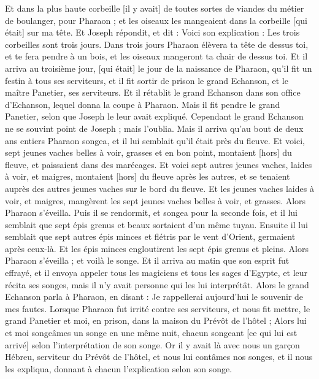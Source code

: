 \begin{multicols}{2}
Et dans la plus haute corbeille [il y avait] de toutes sortes de viandes du métier de boulanger, pour Pharaon ; et les oiseaux les mangeaient dans la corbeille [qui était] sur ma tête.
Et Joseph répondit, et dit : Voici son explication : Les trois corbeilles sont trois jours.
Dans trois jours Pharaon élèvera ta tête de dessus toi, et te fera pendre à un bois, et les oiseaux mangeront ta chair de dessus toi.
Et il arriva au troisième jour, [qui était] le jour de la naissance de Pharaon, qu'il fit un festin à tous ses serviteurs, et il fit sortir de prison le grand Echanson, et le maître Panetier, ses serviteurs.
Et il rétablit le grand Echanson dans son office d'Echanson, lequel donna la coupe à Pharaon.
Mais il fit pendre le grand Panetier, selon que Joseph le leur avait expliqué.
Cependant le grand Echanson ne se souvint point de Joseph ; mais l'oublia.
\VerseOne{}Mais il arriva qu'au bout de deux ans entiers Pharaon songea, et il lui semblait qu'il était près du fleuve.
Et voici, sept jeunes vaches belles à voir, grasses et en bon point, montaient [hors] du fleuve, et paissaient dans des marécages.
Et voici sept autres jeunes vaches, laides à voir, et maigres, montaient [hors] du fleuve après les autres, et se tenaient auprès des autres jeunes vaches sur le bord du fleuve.
Et les jeunes vaches laides à voir, et maigres, mangèrent les sept jeunes vaches belles à voir, et grasses. Alors Pharaon s'éveilla.
Puis il se rendormit, et songea pour la seconde fois, et il lui semblait que sept épis grenus et beaux sortaient d'un même tuyau.
Ensuite il lui semblait que sept autres épis minces et flétris par le vent d'Orient, germaient après ceux-là.
Et les épis minces engloutirent les sept épis grenus et pleins. Alors Pharaon s'éveilla ; et voilà le songe.
Et il arriva au matin que son esprit fut effrayé, et il envoya appeler tous les magiciens et tous les sages d'Egypte, et leur récita ses songes, mais il n'y avait personne qui les lui interprétât.
Alors le grand Echanson parla à Pharaon, en disant : Je rappellerai aujourd'hui le souvenir de mes fautes.
Lorsque Pharaon fut irrité contre ses serviteurs, et nous fit mettre, le grand Panetier et moi, en prison, dans la maison du Prévôt de l'hôtel ;
Alors lui et moi songeâmes un songe en une même nuit, chacun songeant [ce qui lui est arrivé] selon l'interprétation de son songe.
Or il y avait là avec nous un garçon Hébreu, serviteur du Prévôt de l'hôtel, et nous lui contâmes nos songes, et il nous les expliqua, donnant à chacun l'explication selon son songe.

\end{multicols}
